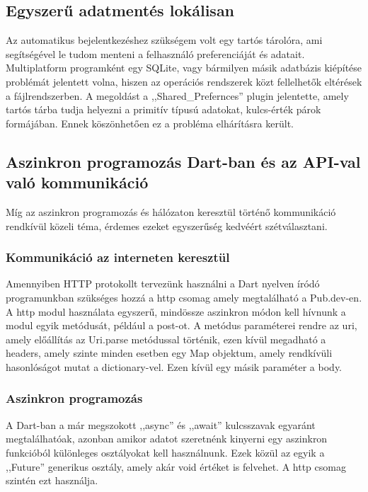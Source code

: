 \documentclass{thesis-ekf}
\theoremstyle{definition}
\theoremstyle{remark}
\begin{document}
	\subsection{Egyszerű adatmentés lokálisan}
	Az automatikus bejelentkezéshez szükségem volt egy tartós tárolóra, ami segítségével le tudom menteni a felhasználó preferenciáját és adatait. Multiplatform programként egy SQLite, vagy bármilyen másik adatbázis kiépítése problémát jelentett volna, hiszen az operációs rendszerek közt fellelhetők eltérések a fájlrendszerben. A megoldást a ,,Shared\_Prefernces'' plugin \cite{bib_flutter_shared_prefs} jelentette, amely tartós tárba tudja helyezni a primitív típusú adatokat, kulcs-érték párok formájában. Ennek köszönhetően ez a probléma elhárításra került.
	\subsection{Aszinkron programozás Dart-ban és az API-val való kommunikáció}
	Míg az aszinkron programozás és hálózaton keresztül történő kommunikáció rendkívül közeli téma, érdemes ezeket egyszerűség kedvéért szétválasztani.
	\subsubsection{Kommunikáció az interneten keresztül}
	Amennyiben HTTP protokollt tervezünk használni a Dart nyelven íródó programunkban szükséges hozzá a http csomag amely megtalálható a Pub.dev-en\cite{bib_flutter_http}. A http modul használata egyszerű, mindössze aszinkron módon kell hívnunk a modul egyik metódusát, például a post-ot. A metódus paraméterei rendre az uri, amely előállítás az Uri.parse metódussal történik, ezen kívül megadható a headers, amely szinte minden esetben egy Map objektum, amely rendkívüli hasonlóságot mutat a dictionary-vel. Ezen kívül egy másik paraméter a body.
	\subsubsection{Aszinkron programozás}
	A Dart-ban a már megszokott ,,async'' és ,,await'' kulcsszavak egyaránt megtalálhatóak, azonban amikor adatot szeretnénk kinyerni egy aszinkron funkcióból különleges osztályokat kell használnunk. Ezek közül az egyik a ,,Future'' generikus osztály, amely akár void értéket is felvehet. A http csomag szintén ezt használja. 
\end{document}
